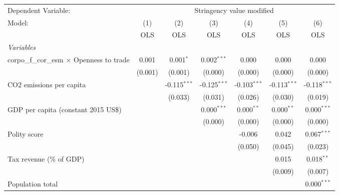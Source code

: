 
\begingroup
\centering
\begin{tabular}{lcccccc}
   \toprule
   Dependent Variable: & \multicolumn{6}{c}{Stringency value modified}\\
   Model:                                            & (1)     & (2)            & (3)            & (4)            & (5)            & (6)\\  
                                                     &  OLS    & OLS            & OLS            & OLS            & OLS            & OLS\\  
   \midrule
   \emph{Variables}\\
   corpo\_f\_cor\_esm $\times$ Openness to trade     & 0.001   & 0.001$^{*}$    & 0.002$^{***}$  & 0.000          & 0.000          & 0.000\\   
                                                     & (0.001) & (0.001)        & (0.000)        & (0.000)        & (0.000)        & (0.000)\\   
   CO2 emissions per capita                          &         & -0.115$^{***}$ & -0.125$^{***}$ & -0.103$^{***}$ & -0.113$^{***}$ & -0.118$^{***}$\\   
                                                     &         & (0.033)        & (0.031)        & (0.026)        & (0.030)        & (0.019)\\   
   GDP per capita (constant 2015 US\$)               &         &                & 0.000$^{***}$  & 0.000$^{**}$   & 0.000$^{**}$   & 0.000$^{***}$\\   
                                                     &         &                & (0.000)        & (0.000)        & (0.000)        & (0.000)\\   
   Polity score                                      &         &                &                & -0.006         & 0.042          & 0.067$^{***}$\\   
                                                     &         &                &                & (0.050)        & (0.045)        & (0.023)\\   
   Tax revenue (\% of GDP)                           &         &                &                &                & 0.015          & 0.018$^{**}$\\   
                                                     &         &                &                &                & (0.009)        & (0.007)\\   
   Population total                                  &         &                &                &                &                & 0.000$^{***}$\\   

\end{tabular}
